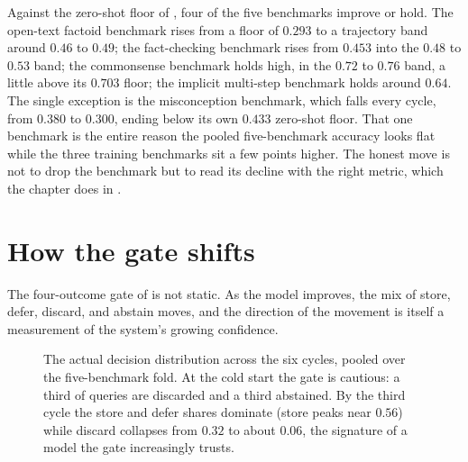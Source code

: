 \begin{precise}
Against the zero-shot floor of , four of the five benchmarks
improve or hold. The open-text factoid benchmark rises from a floor of $0.293$ to a
trajectory band around $0.46$ to $0.49$; the fact-checking benchmark rises from $0.453$
into the $0.48$ to $0.53$ band; the commonsense benchmark holds high, in the $0.72$ to
$0.76$ band, a little above its $0.703$ floor; the implicit multi-step benchmark holds
around $0.64$. The single exception is the misconception benchmark, which falls every
cycle, from $0.380$ to $0.300$, ending below its own $0.433$ zero-shot floor. That one
benchmark is the entire reason the pooled five-benchmark accuracy looks flat while the
three training benchmarks sit a few points higher. The honest move is not to drop the
benchmark but to read its decline with the right metric, which the chapter does in
.
\end{precise}

\section{How the gate shifts}
\label{sec:traj-decisions}

The four-outcome gate of  is not static. As the model improves, the
mix of store, defer, discard, and abstain moves, and the direction of the movement is
itself a measurement of the system's growing confidence.

\begin{figure}[htbp]
\centering
{}
\caption[The four-outcome distribution over the run]{The actual decision distribution
across the six cycles, pooled over the five-benchmark fold. At the cold start the gate
is cautious: a third of queries are discarded and a third abstained. By the third cycle
the store and defer shares dominate (store peaks near $0.56$) while discard collapses
from $0.32$ to about $0.06$, the signature of a model the gate increasingly trusts.}
\label{fig:traj-decisions}
\end{figure}

